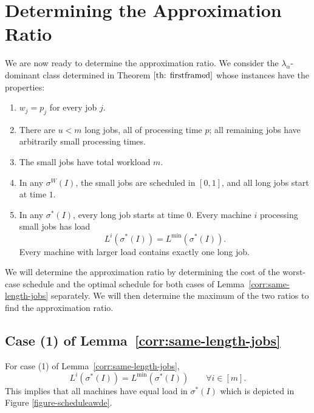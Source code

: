 \documentclass[%
english, titlepage=false %
]{./tum-templates/book/tumbook}
\begin{document}
\section{Determining the Approximation Ratio}
We are now ready to determine the approximation ratio.
We consider the $\lambda_{\alpha}$-dominant class determined in Theorem $\ref{th: firstframed}$ whose instances have the properties:

\begin{framed}\label{prop:instance-structure}
\begin{enumerate}[label=(\roman*)]
    \item \(w_j=p_j\) for every job \(j\).

    \item There are \(u<m\) long jobs, all of processing time \(p\);
          all remaining jobs have arbitrarily small processing times.

    \item The small jobs have total workload \(m\).

    \item In any \(\sigma^{W}(I)\), the small jobs are scheduled in
          \([0,1]\), and all long jobs start at time \(1\).

    \item In any \(\sigma^{*}(I)\), every long job starts at time \(0\).
          Every machine $i$ processing small jobs has load
          \[
              L^{i}(\sigma^{*}(I))
              =
              L^{\min}(\sigma^{*}(I)).
          \]
          Every machine with larger load contains exactly one long job.
\end{enumerate}
\end{framed}

We will determine the approximation ratio by determining the cost of the worst-case schedule and the optimal schedule 
for both cases of Lemma~\ref{corr:same-length-jobs} separately. 
We will then determine the maximum of the two ratios to find the approximation ratio.

\subsection*{Case (1) of Lemma~\ref{corr:same-length-jobs}}

For case (1) of Lemma~\ref{corr:same-length-jobs},
\[
    L^{i}(\sigma^{*}(I)) = L^{\min}(\sigma^{*}(I))
    \qquad \forall i \in [m].
\]
This implies that all machines have equal load in $\sigma^{*}(I)$ which is depicted in Figure \ref{figure-scheduleawde}.
\end{document}
